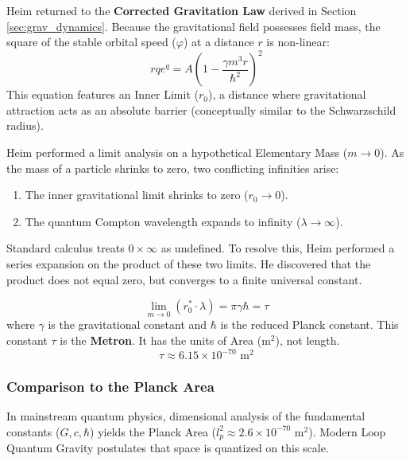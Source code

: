 \documentclass[11pt,a4paper,oneside]{article}
\begin{document}
Heim returned to the \textbf{Corrected Gravitation Law} derived in Section \ref{sec:grav_dynamics}. Because the gravitational field possesses field mass, the square of the stable orbital speed ($\varphi$) at a distance $r$ is non-linear:
\begin{equation}
    r q e^q = A \left(1 - \frac{\gamma m^3 r}{\hbar^2}\right)^2
\end{equation}
This equation features an Inner Limit ($r_0$), a distance where gravitational attraction acts as an absolute barrier (conceptually similar to the Schwarzschild radius).

Heim performed a limit analysis on a hypothetical Elementary Mass ($m \to 0$). As the mass of a particle shrinks to zero, two conflicting infinities arise:
\begin{enumerate}
    \item The inner gravitational limit shrinks to zero ($r_0 \to 0$).
    \item The quantum Compton wavelength expands to infinity ($\lambda \to \infty$).
\end{enumerate}

Standard calculus treats $0 \times \infty$ as undefined. To resolve this, Heim performed a series expansion on the product of these two limits. He discovered that the product does not equal zero, but converges to a finite universal constant.

\begin{tcolorbox}[colback=white, colframe=theoryred, title=\textbf{The Fundamental Geometrical Constant (The Metron)}]
\begin{equation}
    \lim_{m \to 0} (r_0^* \cdot \lambda) = \pi \gamma \hbar = \tau
\end{equation}
where $\gamma$ is the gravitational constant and $\hbar$ is the reduced Planck constant. This constant $\tau$ is the \textbf{Metron}. It has the units of Area ($\text{m}^2$), not length. 
\begin{equation*}
    \tau \approx 6.15 \times 10^{-70} \text{ m}^2
\end{equation*}
\end{tcolorbox}

\subsubsection{Comparison to the Planck Area}
In mainstream quantum physics, dimensional analysis of the fundamental constants ($G, c, \hbar$) yields the Planck Area ($l_p^2 \approx 2.6 \times 10^{-70} \text{ m}^2$). Modern Loop Quantum Gravity postulates that space is quantized on this scale. 
\end{document}
